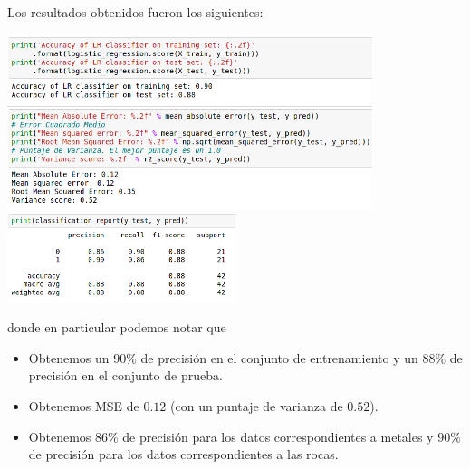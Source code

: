 \documentclass[letterpaper,11pt]{article}
\begin{document}
\begin{enumerate}
    Los resultados obtenidos fueron los siguientes:
    \begin{center}
        \includegraphics[width=0.8\textwidth]{imagenes/sonar-lg1.png}
        \includegraphics[width=0.5\textwidth]{imagenes/sonar-lg2.png}
    \end{center}

    donde en particular podemos notar que 
    \begin{itemize}
        \item Obtenemos un $90\%$ de precisión en el conjunto de entrenamiento 
        y un $88\%$ de precisión en el conjunto de prueba.

        \item Obtenemos MSE de $0.12$ (con un puntaje de varianza de $0.52$).

        \item Obtenemos $86\%$ de precisión para los datos correspondientes a 
        metales y $90\%$ de precisión para los datos correspondientes a las 
        rocas.
    \end{itemize}
    

\end{enumerate}
\end{document}
